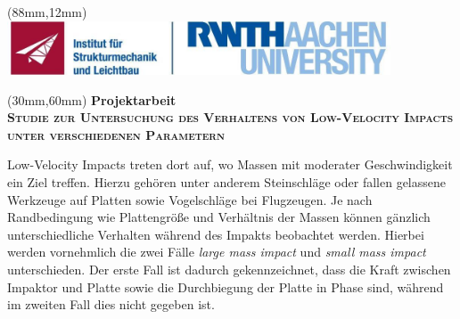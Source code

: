 \begin{textblock*}{110mm}(88mm,12mm)
\includegraphics*[height=16mm]{./pictures/rwth_sla}
\end{textblock*}
%
\begin{textblock*}{\textwidth}(30mm,60mm)
\centering
{\bfseries Projektarbeit} \\[1ex]
\bfseries\scshape Studie zur Untersuchung des Verhaltens von Low-Velocity Impacts unter verschiedenen Parametern\par
\end{textblock*}
\vspace*{40mm}
Low-Velocity Impacts treten dort auf, wo Massen mit moderater Geschwindigkeit ein Ziel treffen. Hierzu gehören unter anderem Steinschläge oder fallen gelassene Werkzeuge auf Platten sowie Vogelschläge bei Flugzeugen. Je nach Randbedingung wie Plattengröße und Verhältnis der Massen können gänzlich unterschiedliche Verhalten während des Impakts beobachtet werden. Hierbei werden vornehmlich die zwei Fälle \textit{large mass impact} und \textit{small mass impact} unterschieden. Der erste Fall ist dadurch gekennzeichnet, dass die Kraft zwischen Impaktor und Platte sowie die Durchbiegung der Platte in Phase sind, während im zweiten Fall dies nicht gegeben ist. 
